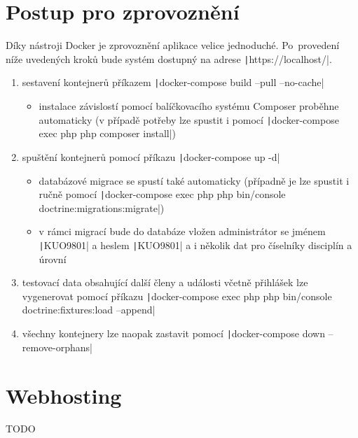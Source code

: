 \section{Postup pro zprovoznění}\label{deploy-steps}
Díky nástroji Docker je zprovoznění aplikace velice jednoduché. Po~provedení níže uvedených kroků bude systém dostupný na adrese \texttt|https://localhost/|.

\begin{enumerate}
	\item sestavení kontejnerů příkazem \texttt|docker-compose build --pull --no-cache|
	\begin{itemize}
		\item instalace závislostí pomocí balíčkovacího systému Composer proběhne automaticky (v případě potřeby lze spustit i pomocí \texttt|docker-compose exec php php composer install|)
	\end{itemize}
	\item spuštění kontejnerů pomocí příkazu \texttt|docker-compose up -d|
	\begin{itemize}
		\item databázové migrace se spustí také automaticky (případně je lze spustit i ručně pomocí \texttt|docker-compose exec php php bin/console doctrine:migrations:migrate|)
		\item v rámci migrací bude do databáze vložen administrátor se jménem \texttt|KUO9801| a heslem \texttt|KUO9801| a i několik dat pro číselníky disciplín a úrovní
	\end{itemize}
	\item testovací data obsahující další členy a události včetně přihlášek lze vygenerovat pomocí příkazu \texttt|docker-compose exec php php bin/console doctrine:fixtures:load --append|
	\item všechny kontejnery lze naopak zastavit pomocí \texttt|docker-compose down --remove-orphans|
\end{enumerate}

\section{Webhosting}
TODO
